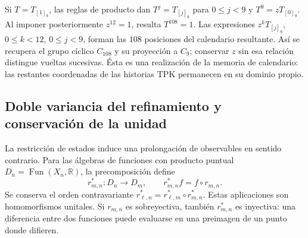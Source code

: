 Si \(T=T_{[1]_9}\), las reglas de producto dan
\(T^j=T_{[j]_9}\) para \(0\le j<9\) y \(T^9=zT_{[0]_9}\).
Al imponer posteriormente \(z^{12}=1\), resulta \(T^{108}=1\).
Las expresiones \(z^kT_{[j]_9}\), \(0\le k<12\), \(0\le j<9\),
forman las \(108\) posiciones del calendario resultante. Así se recupera
el grupo cíclico \(C_{108}\) y su proyección a \(C_9\); conservar
\(z\) sin esa relación distingue vueltas sucesivas. Ésta es una
realización de la memoria de calendario: las restantes coordenadas de
las historias TPK permanecen en su dominio propio.

\subsection{Doble variancia del refinamiento y conservación de la unidad}
\label{hist:doble-varianza}

La restricción de estados induce una prolongación de observables en sentido
contrario. Para las álgebras de funciones con producto puntual
\(D_n=\operatorname{Fun}(X_n,\mathbb R)\), la precomposición define
\begin{equation}
 r_{m,n}^*:D_n\longrightarrow D_m,
 \qquad r_{m,n}^*f=f\circ r_{m,n}.
 \label{vi:hist:precomposicion}
\end{equation}
Se conserva el orden contravariante
\(r_{\ell,n}^*=r_{\ell,m}^*\circ r_{m,n}^*\). Estas aplicaciones
son homomorfismos unitales. Si \(r_{m,n}\) es sobreyectiva, también
\(r_{m,n}^*\) es inyectiva: una diferencia entre dos funciones puede
evaluarse en una preimagen de un punto donde difieren.

